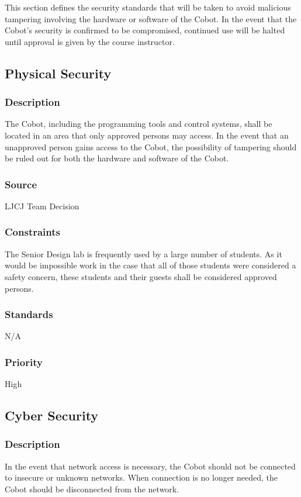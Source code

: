 This section defines the security standards that will be taken to avoid malicious tampering involving the hardware or software of the Cobot. In the event that the Cobot's security is confirmed to be compromised, continued use will be halted until approval is given by the course instructor.

\subsection{Physical Security}
\subsubsection{Description}
The Cobot, including the programming tools and control systems, shall be located in an area that only approved persons may access. In the event that an unapproved person gains access to the Cobot, the possibility of tampering should be ruled out for both the hardware and software of the Cobot.
\subsubsection{Source}
LJCJ Team Decision
\subsubsection{Constraints}
The Senior Design lab is frequently used by a large number of students. As it would be impossible work in the case that all of those students were considered a safety concern, these students and their guests shall be considered approved persons.
\subsubsection{Standards}
N/A
\subsubsection{Priority}
High

\subsection{Cyber Security}
\subsubsection{Description}
In the event that network access is necessary, the Cobot should not be connected to insecure or unknown networks. When connection is no longer needed, the Cobot should be disconnected from the network.

